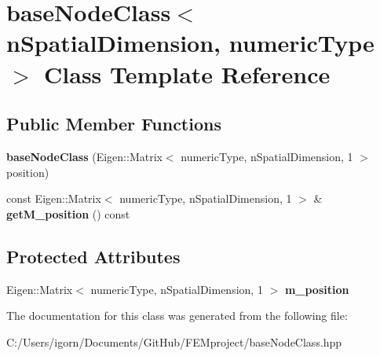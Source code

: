 \hypertarget{classbase_node_class}{}\section{base\+Node\+Class$<$ n\+Spatial\+Dimension, numeric\+Type $>$ Class Template Reference}
\label{classbase_node_class}
\subsection*{Public Member Functions}
\begin{DoxyCompactItemize}
\item 
\mbox{\label{classbase_node_class_a951ba5f8a8e7082ac978c1a3cffc6ccc}} 
{\bfseries base\+Node\+Class} (Eigen\+::\+Matrix$<$ numeric\+Type, n\+Spatial\+Dimension, 1 $>$ position)
\item 
\mbox{\label{classbase_node_class_ade0aa681b0ac36364b31a7fcf4b4c295}} 
const Eigen\+::\+Matrix$<$ numeric\+Type, n\+Spatial\+Dimension, 1 $>$ \& {\bfseries get\+M\+\_\+position} () const
\end{DoxyCompactItemize}
\subsection*{Protected Attributes}
\begin{DoxyCompactItemize}
\item 
\mbox{\label{classbase_node_class_a68f14d13ea4a416c943f67a60d3107aa}} 
Eigen\+::\+Matrix$<$ numeric\+Type, n\+Spatial\+Dimension, 1 $>$ {\bfseries m\+\_\+position}
\end{DoxyCompactItemize}


The documentation for this class was generated from the following file\+:\begin{DoxyCompactItemize}
\item 
C\+:/\+Users/igorn/\+Documents/\+Git\+Hub/\+F\+E\+Mproject/base\+Node\+Class.\+hpp\end{DoxyCompactItemize}
